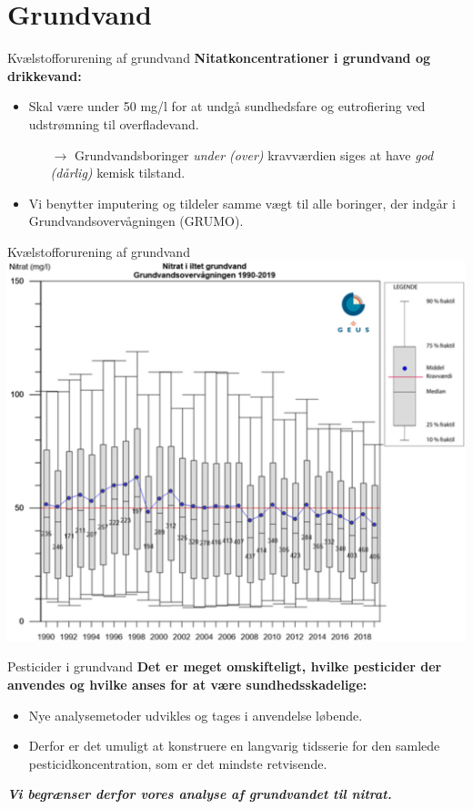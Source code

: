 \section{Grundvand}

\begin{frame}{Kvælstofforurening af grundvand}
  \textbf{Nitatkoncentrationer i grundvand og drikkevand:}
  \begin{itemize}
    \item Skal være under 50 mg/l for at undgå sundhedsfare og eutrofiering ved udstrømning til overfladevand.
    \begin{itemize}
      \item[$\rightarrow$] \normalsize Grundvandsboringer \textit{under (over)} kravværdien siges at have \textit{god (dårlig)} kemisk tilstand.
    \end{itemize}
    \item Vi benytter imputering og tildeler samme vægt til alle boringer, der indgår i Grundvandsovervågningen (GRUMO).
  \end{itemize}
  \vfill
\end{frame}

\begin{frame}{Kvælstofforurening af grundvand}
  \center
  \includegraphics[width=.8\textwidth]{figures/nitrate}
\end{frame}

\begin{frame}{Pesticider i grundvand}
    \textbf{Det er meget omskifteligt, hvilke pesticider der anvendes og hvilke anses for at være sundhedsskadelige:}
    \begin{itemize}
      \item Nye analysemetoder udvikles og tages i anvendelse løbende.
      \item Derfor er det umuligt at konstruere en langvarig tidsserie for den samlede pesticidkoncentration, som er det mindste retvisende.
    \end{itemize}
    \textit{\textbf{Vi begrænser derfor vores analyse af grundvandet til nitrat.}}
\end{frame}

